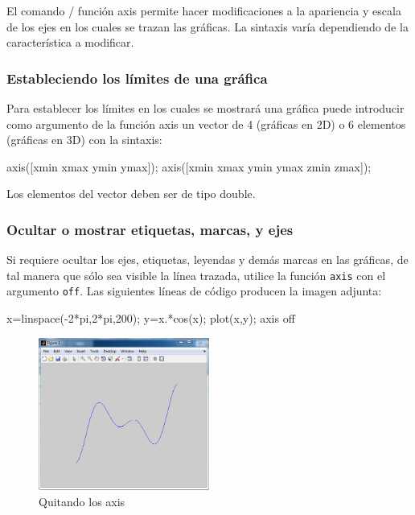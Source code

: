 El comando / función axis permite hacer modificaciones a la apariencia y
escala de los ejes en los cuales se trazan las gráficas. La sintaxis
varía dependiendo de la característica a modificar.

\subsubsection{Estableciendo los límites de una gráfica}

Para establecer los límites en los cuales se mostrará una gráfica puede
introducir como argumento de la función axis un vector de 4 (gráficas en
2D) o 6 elementos (gráficas en 3D) con la sintaxis:

\begin{matlab}
axis([xmin xmax ymin ymax]); %
axis([xmin xmax ymin ymax zmin zmax]); %
\end{matlab}

Los elementos del vector deben ser de tipo double.

\subsubsection{Ocultar o mostrar etiquetas, marcas, y ejes}

Si requiere ocultar los ejes, etiquetas, leyendas y demás marcas en las
gráficas, de tal manera que sólo sea visible la línea trazada, utilice
la función \texttt{axis} con el argumento \texttt{off}. Las siguientes
líneas de código producen la imagen adjunta:

\begin{matlab}
x=linspace(-2*pi,2*pi,200);
y=x.*cos(x);
plot(x,y);
axis off
\end{matlab}

\begin{figure}[htbp]
    \centering
    \includegraphics[width=0.5\textwidth]{src/img/ch4/img_4_5.png}
    \caption{Quitando los axis}
    \label{fig:img_4_5}
\end{figure}

